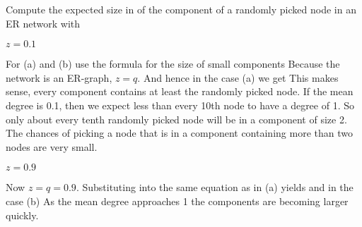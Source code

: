 
Compute the expected size in of the component of a randomly picked node in an ER network with

\subquestion $z=0.1$

\solution 
For (a) and (b) use the formula for the size of small components
Because the network is an ER-graph, $z=q$. And hence in the case (a) we get 
This makes sense, every component contains at least the randomly picked node. If the mean degree is 0.1, then we expect less than every 10th node to have a degree of 1. So only about every tenth randomly picked node will be in a component of size 2. The chances of picking a node that is in a component containing more than two nodes are very small. 

\subquestion $z=0.9$

\solution
Now $z=q=0.9$. Substituting into the same equation as in (a) yields 
and in the case (b)
As the mean degree approaches 1 the components are becoming larger quickly.
